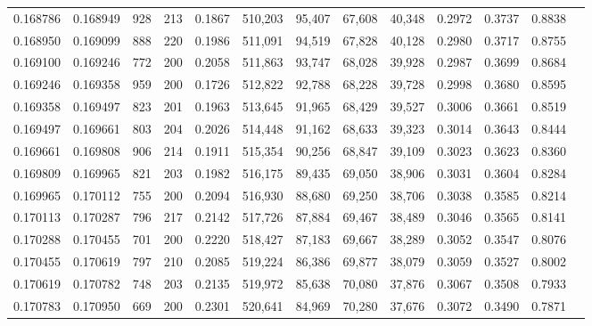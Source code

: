 \begin{tabular}{rrrrrrrrrrrrr}
0.168786 & 0.168949 &   928 & 213 &                                     0.1867 & 510,203 &  95,407 &  67,608 &  40,348 & 0.2972 & 0.3737 & 0.8838 \\
0.168950 & 0.169099 &   888 & 220 &                                     0.1986 & 511,091 &  94,519 &  67,828 &  40,128 & 0.2980 & 0.3717 & 0.8755 \\
0.169100 & 0.169246 &   772 & 200 &                                     0.2058 & 511,863 &  93,747 &  68,028 &  39,928 & 0.2987 & 0.3699 & 0.8684 \\
0.169246 & 0.169358 &   959 & 200 &                                     0.1726 & 512,822 &  92,788 &  68,228 &  39,728 & 0.2998 & 0.3680 & 0.8595 \\
0.169358 & 0.169497 &   823 & 201 &                                     0.1963 & 513,645 &  91,965 &  68,429 &  39,527 & 0.3006 & 0.3661 & 0.8519 \\
0.169497 & 0.169661 &   803 & 204 &                                     0.2026 & 514,448 &  91,162 &  68,633 &  39,323 & 0.3014 & 0.3643 & 0.8444 \\
0.169661 & 0.169808 &   906 & 214 &                                     0.1911 & 515,354 &  90,256 &  68,847 &  39,109 & 0.3023 & 0.3623 & 0.8360 \\
0.169809 & 0.169965 &   821 & 203 &                                     0.1982 & 516,175 &  89,435 &  69,050 &  38,906 & 0.3031 & 0.3604 & 0.8284 \\
0.169965 & 0.170112 &   755 & 200 &                                     0.2094 & 516,930 &  88,680 &  69,250 &  38,706 & 0.3038 & 0.3585 & 0.8214 \\
0.170113 & 0.170287 &   796 & 217 &                                     0.2142 & 517,726 &  87,884 &  69,467 &  38,489 & 0.3046 & 0.3565 & 0.8141 \\
0.170288 & 0.170455 &   701 & 200 &                                     0.2220 & 518,427 &  87,183 &  69,667 &  38,289 & 0.3052 & 0.3547 & 0.8076 \\
0.170455 & 0.170619 &   797 & 210 &                                     0.2085 & 519,224 &  86,386 &  69,877 &  38,079 & 0.3059 & 0.3527 & 0.8002 \\
0.170619 & 0.170782 &   748 & 203 &                                     0.2135 & 519,972 &  85,638 &  70,080 &  37,876 & 0.3067 & 0.3508 & 0.7933 \\
0.170783 & 0.170950 &   669 & 200 &                                     0.2301 & 520,641 &  84,969 &  70,280 &  37,676 & 0.3072 & 0.3490 & 0.7871 \\

\end{tabular}
